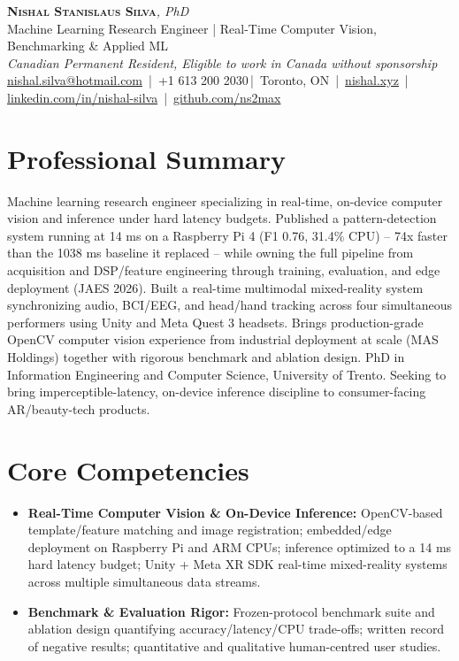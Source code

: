 \documentclass[11pt]{article}
\makeatletter
\newcommand{\cvName}{Nishal Stanislaus Silva}
\newcommand{\cvEmail}{nishal.silva@hotmail.com}
\newcommand{\cvPhone}{+1 613 200 2030}
\newcommand{\cvCity}{Toronto, ON}
\newcommand{\cvSite}{https://nishal.xyz}
\newcommand{\cvLinkedIn}{https://www.linkedin.com/in/nishal-silva}
\newcommand{\cvGitHub}{https://github.com/ns2max}
\newcommand{\cvStatus}{Canadian Permanent Resident, Eligible to work in Canada without sponsorship}
\newcommand{\cvTagline}{Machine Learning Research Engineer | Real-Time Computer Vision, Benchmarking \& Applied ML}
\makeatother
\begin{document}
\pagestyle{empty}
\begin{center}
    {\LARGE \scshape \textbf{\cvName}}{\large \textit{, PhD}}\\[1pt]
    {\small \cvTagline}\\[1pt]
    {\footnotesize\textit{\cvStatus}}\\[1pt]
    {\small
    \href{mailto:\cvEmail}{\cvEmail} \,|\, \cvPhone \,|\, \cvCity
    \,|\, \href{\cvSite}{nishal.xyz} \,|\, \href{\cvLinkedIn}{linkedin.com/in/nishal-silva}
    \,|\, \href{\cvGitHub}{github.com/ns2max}}
\end{center}

\section*{Professional Summary}
Machine learning research engineer specializing in real-time, on-device computer vision and inference under hard latency budgets. Published a pattern-detection system running at 14 ms on a Raspberry Pi 4 (F1 0.76, 31.4\% CPU) -- 74x faster than the 1038 ms baseline it replaced -- while owning the full pipeline from acquisition and DSP/feature engineering through training, evaluation, and edge deployment (JAES 2026). Built a real-time multimodal mixed-reality system synchronizing audio, BCI/EEG, and head/hand tracking across four simultaneous performers using Unity and Meta Quest 3 headsets. Brings production-grade OpenCV computer vision experience from industrial deployment at scale (MAS Holdings) together with rigorous benchmark and ablation design. PhD in Information Engineering and Computer Science, University of Trento. Seeking to bring imperceptible-latency, on-device inference discipline to consumer-facing AR/beauty-tech products.

\section*{Core Competencies}
\begin{itemize}[leftmargin=1.4em, itemsep=-0.2em, topsep=0.2em]
    \item \textbf{Real-Time Computer Vision \& On-Device Inference:} OpenCV-based template/feature matching and image registration; embedded/edge deployment on Raspberry Pi and ARM CPUs; inference optimized to a 14 ms hard latency budget; Unity + Meta XR SDK real-time mixed-reality systems across multiple simultaneous data streams.
    \item \textbf{Benchmark \& Evaluation Rigor:} Frozen-protocol benchmark suite and ablation design quantifying accuracy/latency/CPU trade-offs; written record of negative results; quantitative and qualitative human-centred user studies.
\end{itemize}
\end{document}
